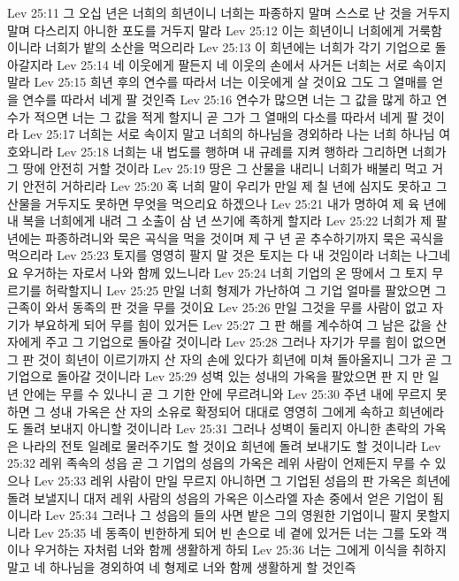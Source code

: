 Lev 25:11  그 오십 년은 너희의 희년이니 너희는 파종하지 말며 스스로 난 것을 거두지 말며 다스리지 아니한 포도를 거두지 말라
Lev 25:12  이는 희년이니 너희에게 거룩함이니라 너희가 밭의 소산을 먹으리라
Lev 25:13  이 희년에는 너희가 각기 기업으로 돌아갈지라
Lev 25:14  네 이웃에게 팔든지 네 이웃의 손에서 사거든 너희는 서로 속이지 말라
Lev 25:15  희년 후의 연수를 따라서 너는 이웃에게 살 것이요 그도 그 열매를 얻을 연수를 따라서 네게 팔 것인즉
Lev 25:16  연수가 많으면 너는 그 값을 많게 하고 연수가 적으면 너는 그 값을 적게 할지니 곧 그가 그 열매의 다소를 따라서 네게 팔 것이라
Lev 25:17  너희는 서로 속이지 말고 너희의 하나님을 경외하라 나는 너희 하나님 여호와니라
Lev 25:18  너희는 내 법도를 행하며 내 규례를 지켜 행하라 그리하면 너희가 그 땅에 안전히 거할 것이라
Lev 25:19  땅은 그 산물을 내리니 너희가 배불리 먹고 거기 안전히 거하리라
Lev 25:20  혹 너희 말이 우리가 만일 제 칠 년에 심지도 못하고 그 산물을 거두지도 못하면 무엇을 먹으리요 하겠으나
Lev 25:21  내가 명하여 제 육 년에 내 복을 너희에게 내려 그 소출이 삼 년 쓰기에 족하게 할지라
Lev 25:22  너희가 제 팔 년에는 파종하려니와 묵은 곡식을 먹을 것이며 제 구 년 곧 추수하기까지 묵은 곡식을 먹으리라
Lev 25:23  토지를 영영히 팔지 말 것은 토지는 다 내 것임이라 너희는 나그네요 우거하는 자로서 나와 함께 있느니라
Lev 25:24  너희 기업의 온 땅에서 그 토지 무르기를 허락할지니
Lev 25:25  만일 너희 형제가 가난하여 그 기업 얼마를 팔았으면 그 근족이 와서 동족의 판 것을 무를 것이요
Lev 25:26  만일 그것을 무를 사람이 없고 자기가 부요하게 되어 무를 힘이 있거든
Lev 25:27  그 판 해를 계수하여 그 남은 값을 산 자에게 주고 그 기업으로 돌아갈 것이니라
Lev 25:28  그러나 자기가 무를 힘이 없으면 그 판 것이 희년이 이르기까지 산 자의 손에 있다가 희년에 미쳐 돌아올지니 그가 곧 그 기업으로 돌아갈 것이니라
Lev 25:29  성벽 있는 성내의 가옥을 팔았으면 판 지 만 일 년 안에는 무를 수 있나니 곧 그 기한 안에 무르려니와
Lev 25:30  주년 내에 무르지 못하면 그 성내 가옥은 산 자의 소유로 확정되어 대대로 영영히 그에게 속하고 희년에라도 돌려 보내지 아니할 것이니라
Lev 25:31  그러나 성벽이 둘리지 아니한 촌락의 가옥은 나라의 전토 일례로 물러주기도 할 것이요 희년에 돌려 보내기도 할 것이니라
Lev 25:32  레위 족속의 성읍 곧 그 기업의 성읍의 가옥은 레위 사람이 언제든지 무를 수 있으나
Lev 25:33  레위 사람이 만일 무르지 아니하면 그 기업된 성읍의 판 가옥은 희년에 돌려 보낼지니 대저 레위 사람의 성읍의 가옥은 이스라엘 자손 중에서 얻은 기업이 됨이니라
Lev 25:34  그러나 그 성읍의 들의 사면 밭은 그의 영원한 기업이니 팔지 못할지니라
Lev 25:35  네 동족이 빈한하게 되어 빈 손으로 네 곁에 있거든 너는 그를 도와 객이나 우거하는 자처럼 너와 함께 생활하게 하되
Lev 25:36  너는 그에게 이식을 취하지 말고 네 하나님을 경외하여 네 형제로 너와 함께 생활하게 할 것인즉
